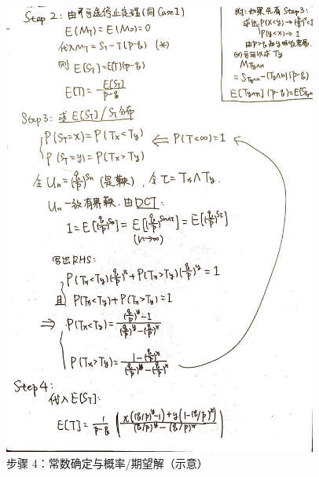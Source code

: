 \documentclass[12pt, a4paper, oneside, fontset=windows]{ctexbook}
\begin{document}
\begin{figure}[h]
	\centering
	\includegraphics[width=0.92\textwidth]{4.jpg}
	\caption{步骤 4：常数确定与概率/期望解（示意）}\label{fig:rw-step4}
\end{figure}
\end{document}
